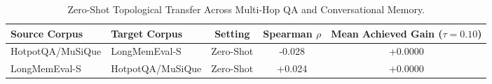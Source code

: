 \begin{table}[t]
\centering
\small
\caption{Zero-Shot Topological Transfer Across Multi-Hop QA and Conversational Memory.}
\label{tab:zero_shot_transfer}
\begin{tabular}{llccc}
\toprule
\textbf{Source Corpus} & \textbf{Target Corpus} & \textbf{Setting} & \textbf{Spearman $\rho$} & \textbf{Mean Achieved Gain ($\tau=0.10$)} \\
\midrule
HotpotQA/MuSiQue & LongMemEval-S & Zero-Shot & -0.028 & +0.0000 \\
LongMemEval-S & HotpotQA/MuSiQue & Zero-Shot & +0.024 & +0.0000 \\
\bottomrule
\end{tabular}
\end{table}
